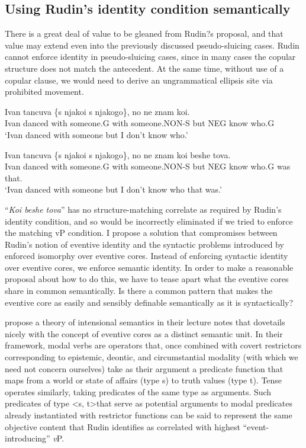 \documentclass{turabian-researchpaper}
\begin{document}
\subsection{Using Rudin's identity condition semantically}
There is a great deal of value to be gleaned from Rudin?s proposal, and that value may extend even into the previously discussed pseudo-sluicing cases. Rudin cannot enforce identity in pseudo-sluicing cases, since in many cases the copular structure does not match the antecedent. At the same time, without use of a copular clause, we would need to derive an ungrammatical ellipsis site via prohibited movement. 

\begin{exe}
\gll Ivan tancuva \{s njakoi \textbar s njakogo\}, no ne znam koi. \\
Ivan danced with someone.G with someone.NON-S but NEG know who.G \\
\trans `Ivan danced with someone but I don't know who.'
\end{exe}

\begin{exe}
\ex\label{ivandanced7}
\gll Ivan tancuva \{s njakoi \textbar s njakogo\}, no ne znam koi beshe tova. \\
Ivan danced with someone.G with someone.NON-S but NEG know who.G was that. \\
\trans `Ivan danced with someone but I don't know who that was.'
\end{exe}

``\textit{Koi beshe tova}'' has no structure-matching correlate as required by Rudin's identity condition, and so would be incorrectly eliminated if we tried to enforce the matching vP condition. 
I propose a solution that compromises between Rudin's notion of eventive identity and the syntactic problems introduced by enforced isomorphy over eventive cores. Instead of enforcing syntactic identity over eventive cores, we enforce semantic identity. In order to make a reasonable proposal about how to do this, we have to tease apart what the eventive cores share in common semantically. Is there a common pattern that makes the eventive core as easily and sensibly definable semantically as it is syntactically?

\citet{heimvonfintel} propose a theory of intensional semantics in their lecture notes that dovetails nicely with the concept of eventive cores as a distinct semantic unit. In their framework, modal verbs are operators that, once combined with covert restrictors corresponding to epistemic, deontic, and circumstantial modality (with which we need not concern ourselves) take as their argument a predicate function that maps from a world or state of affairs (type s) to truth values (type t). Tense operates similarly, taking predicates of the same type as arguments. Such predicates of type \textless s, t\textgreater that serve as potential arguments to modal predicates already instantiated with restrictor functions can be said to represent the same objective content that Rudin identifies as correlated with highest ``event-introducing'' \textit{v}P.
\end{document}
